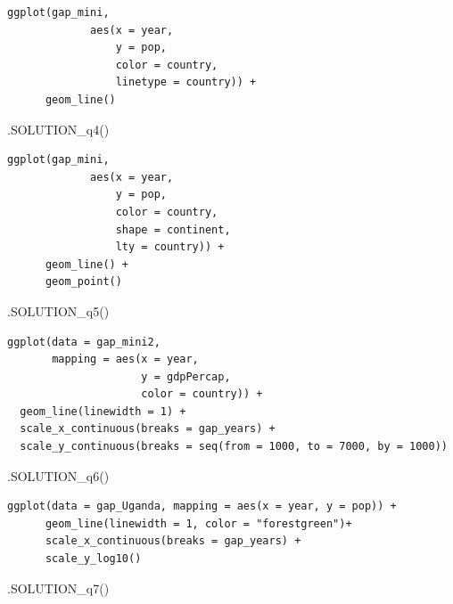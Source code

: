 \documentclass[
  letterpaper,
  DIV=11,
  numbers=noendperiod]{scrreprt}
\newenvironment{Shaded}{\begin{snugshade}}{\end{snugshade}}
\newcommand{\FunctionTok}[1]{\textcolor[rgb]{0.28,0.35,0.67}{#1}}
\newcommand{\NormalTok}[1]{\textcolor[rgb]{0.00,0.23,0.31}{#1}}
\begin{document}
\begin{verbatim}
ggplot(gap_mini,
             aes(x = year,
                 y = pop,
                 color = country,
                 linetype = country)) +
      geom_line()
\end{verbatim}

\begin{Shaded}
\begin{Highlighting}[]
\FunctionTok{.SOLUTION\_q4}\NormalTok{()}
\end{Highlighting}
\end{Shaded}

\begin{verbatim}
ggplot(gap_mini,
             aes(x = year,
                 y = pop,
                 color = country,
                 shape = continent,
                 lty = country)) +
      geom_line() +
      geom_point()
\end{verbatim}

\begin{Shaded}
\begin{Highlighting}[]
\FunctionTok{.SOLUTION\_q5}\NormalTok{()}
\end{Highlighting}
\end{Shaded}

\begin{verbatim}
ggplot(data = gap_mini2, 
       mapping = aes(x = year, 
                     y = gdpPercap, 
                     color = country)) +
  geom_line(linewidth = 1) +
  scale_x_continuous(breaks = gap_years) +
  scale_y_continuous(breaks = seq(from = 1000, to = 7000, by = 1000))
\end{verbatim}

\begin{Shaded}
\begin{Highlighting}[]
\FunctionTok{.SOLUTION\_q6}\NormalTok{()}
\end{Highlighting}
\end{Shaded}

\begin{verbatim}
ggplot(data = gap_Uganda, mapping = aes(x = year, y = pop)) + 
      geom_line(linewidth = 1, color = "forestgreen")+
      scale_x_continuous(breaks = gap_years) +
      scale_y_log10()
\end{verbatim}

\begin{Shaded}
\begin{Highlighting}[]
\FunctionTok{.SOLUTION\_q7}\NormalTok{()}
\end{Highlighting}
\end{Shaded}
\end{document}
